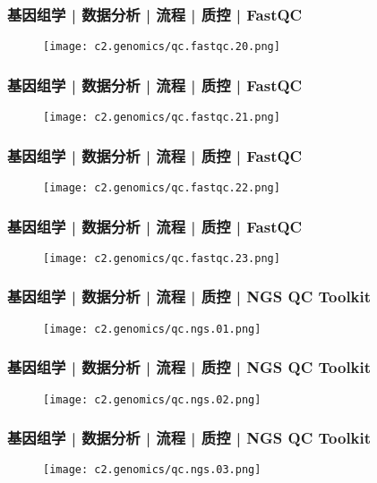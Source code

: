 \begin{frame}
  \frametitle{基因组学 | 数据分析 | 流程 | 质控 | FastQC}
  \begin{figure}
    \centering
    \texttt{[image: c2.genomics/qc.fastqc.20.png]}
  \end{figure}
\end{frame}

\begin{frame}
  \frametitle{基因组学 | 数据分析 | 流程 | 质控 | FastQC}
  \begin{figure}
    \centering
    \texttt{[image: c2.genomics/qc.fastqc.21.png]}
  \end{figure}
\end{frame}

\begin{frame}
  \frametitle{基因组学 | 数据分析 | 流程 | 质控 | FastQC}
  \begin{figure}
    \centering
    \texttt{[image: c2.genomics/qc.fastqc.22.png]}
  \end{figure}
\end{frame}

\begin{frame}
  \frametitle{基因组学 | 数据分析 | 流程 | 质控 | FastQC}
  \begin{figure}
    \centering
    \texttt{[image: c2.genomics/qc.fastqc.23.png]}
  \end{figure}
\end{frame}

\begin{frame}
  \frametitle{基因组学 | 数据分析 | 流程 | 质控 | NGS QC Toolkit}
  \begin{figure}
    \centering
    \texttt{[image: c2.genomics/qc.ngs.01.png]}
  \end{figure}
\end{frame}

\begin{frame}
  \frametitle{基因组学 | 数据分析 | 流程 | 质控 | NGS QC Toolkit}
  \begin{figure}
    \centering
    \texttt{[image: c2.genomics/qc.ngs.02.png]}
  \end{figure}
\end{frame}

\begin{frame}
  \frametitle{基因组学 | 数据分析 | 流程 | 质控 | NGS QC Toolkit}
  \begin{figure}
    \centering
    \texttt{[image: c2.genomics/qc.ngs.03.png]}
  \end{figure}
\end{frame}

